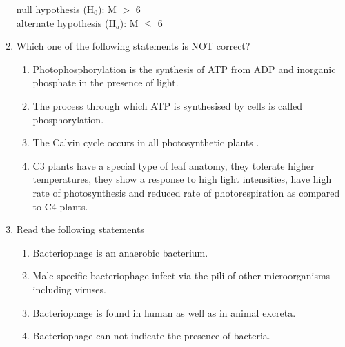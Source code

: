 \documentclass[journal,12pt,onecolumn]{IEEEtran}
\theoremstyle{remark}
\begin{document}
\begin{enumerate}
\begin{center}
null hypothesis (H$_0$): \quad M $>$ 6 \\
alternate hypothesis (H$_a$): \quad M $\leq$ 6
\end{center}

\begin{enumerate}
\end{enumerate}
\hfill{}
\item Which one of the following statements is NOT correct?
\begin{enumerate}
\item Photophosphorylation is the synthesis of ATP from ADP and inorganic phosphate in the presence of light.
\item The process through which ATP is synthesised by cells  is called phosphorylation.
\item The Calvin cycle  occurs in all photosynthetic plants .
\item C3 plants have a special type of leaf anatomy, they tolerate higher temperatures, they show a response to high light intensities, have high rate of photosynthesis and reduced rate of photorespiration as compared to C4 plants.
\end{enumerate}
\hfill{}

\newpage

\item Read the following statements
\begin{enumerate}[label=\Roman*.]
\item Bacteriophage is an anaerobic bacterium.
\item Male-specific bacteriophage infect via the pili of other microorganisms including viruses.
\item Bacteriophage is found in human as well as in animal excreta.
\item Bacteriophage can not indicate the presence of bacteria.
\end{enumerate}


\end{enumerate}
\end{document}

